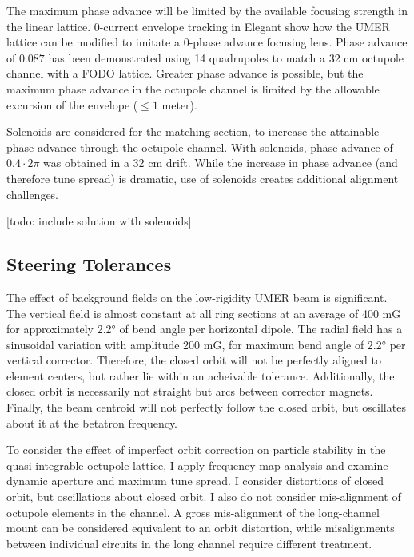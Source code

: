 The maximum phase advance will be limited by the available focusing strength in the linear lattice.
0-current envelope tracking in Elegant show how the UMER lattice can be modified to imitate a 0-phase advance focusing lens.\cite{RuisardAAC2014} 
Phase advance of $0.087$ has been demonstrated using 14 quadrupoles to match a 32 cm octupole channel with a FODO lattice. Greater phase advance is possible, but the maximum phase advance in the octupole channel is limited by the allowable excursion of the envelope ($\leq1$ meter).

Solenoids are considered for the matching section, to increase the attainable phase advance through the octupole channel. With solenoids, phase advance of $0.4\cdot2 \pi$ was obtained in a 32 cm drift. 
While the increase in phase advance (and therefore tune spread) is dramatic, use of solenoids creates additional alignment challenges. 

[todo: include solution with solenoids]






\subsection{Steering Tolerances}

The effect of background fields on the low-rigidity UMER beam is significant.  The vertical field is almost constant at all ring sections at an average of 400 mG for approximately 2.2° of bend angle per horizontal dipole. The radial field has a sinusoidal variation with amplitude 200 mG, for maximum bend angle of 2.2° per vertical corrector. Therefore, the closed orbit will not be perfectly aligned to element centers, but rather lie within an acheivable tolerance. Additionally, the closed orbit is necessarily not straight but arcs between corrector magnets. Finally, the beam centroid will not perfectly follow the closed orbit, but oscillates about it at the betatron frequency. 

To consider the effect of imperfect orbit correction on particle stability in the quasi-integrable octupole lattice, I apply frequency map analysis and examine dynamic aperture and maximum tune spread. I consider distortions of closed orbit, but oscillations about closed orbit. I also do not consider mis-alignment of octupole elements in the channel. A gross mis-alignment of the long-channel mount can be considered equivalent to an orbit distortion, while misalignments between individual circuits in the long channel require different treatment.

